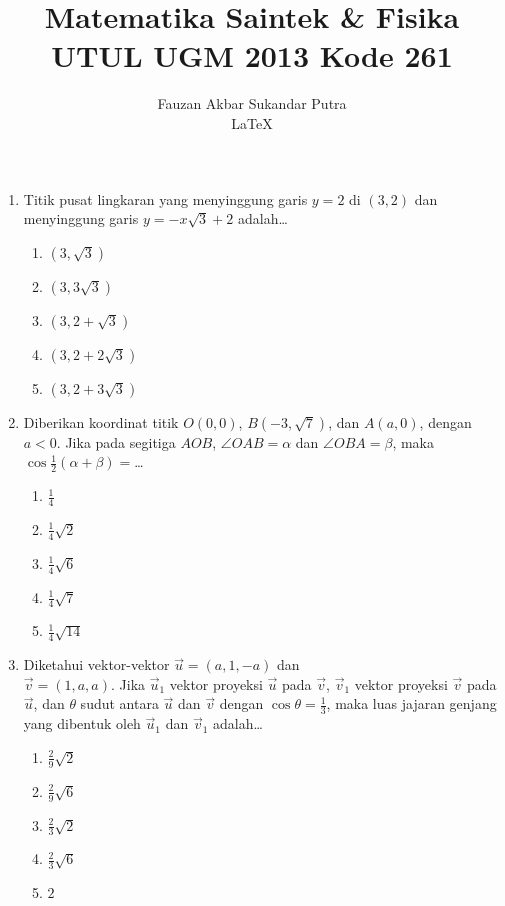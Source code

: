 \documentclass[A4,12PT, english, twocolumn]{journal}
\title{Matematika Saintek \& Fisika UTUL UGM 2013 Kode 261}
\author{Fauzan Akbar Sukandar Putra \\ \LaTeX}
\begin{document}
\maketitle

\begin{enumerate}


\item Titik pusat lingkaran yang menyinggung garis $y=2$ di $(3,2)$ dan menyinggung garis $y=-x\sqrt3+2$ adalah\dots
    \begin{enumerate}
        \item $(3,\sqrt3)$
        \item $(3,3\sqrt3)$
        \item $(3,2+\sqrt3)$
        \item $(3,2+2\sqrt3)$
        \item $(3,2+3\sqrt3)$
    \end{enumerate}

\item Diberikan koordinat titik $O(0,0)$, $B(-3,\sqrt7)$, dan $A(a,0)$, dengan $a < 0$. Jika pada segitiga $AOB$, $\angle OAB=\alpha$ dan $\angle OBA=\beta$, maka $\cos \frac{1}{2}(\alpha +\beta )=$\dots
    \begin{enumerate}
        \item $\frac{1}{4}$
        \item $\frac{1}{4}\sqrt{2}$
        \item $\frac{1}{4}\sqrt{6}$
        \item $\frac{1}{4}\sqrt{7}$
        \item $\frac{1}{4}\sqrt{14}$
    \end{enumerate}

\item Diketahui vektor-vektor $\vec{u}=(a,1,-a)$ dan \\ $\vec{v}=(1,a,a)$. Jika ${{\vec{u}}_{1}}$ vektor proyeksi $\vec{u}$ pada $\vec{v}$, ${{\vec{v}}_{1}}$ vektor proyeksi $\vec{v}$ pada $\vec{u}$, dan $\theta$ sudut antara $\vec{u}$ dan $\vec{v}$ dengan $\cos \theta =\frac{1}{3}$, maka luas jajaran genjang yang dibentuk oleh ${{\vec{u}}_{1}}$ dan ${{\vec{v}}_{1}}$ adalah\dots
    \begin{enumerate}
        \item $\frac{2}{9}\sqrt{2}$
        \item $\frac{2}{9}\sqrt{6}$
        \item $\frac{2}{3}\sqrt{2}$
        \item $\frac{2}{3}\sqrt{6}$
        \item $2$
    \end{enumerate}


\end{enumerate}
\end{document}
